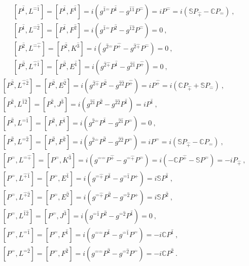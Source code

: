 \documentclass[12pt,a4paper]{report}
\begin{document}
\begin{align*}
    &\left[P^{\hat{1}},L^{\hat{-}\hat{1}}\right]=\left[P^{\hat{1}},F^\hat{1}\right]=i\left(g^{\hat{1}\hat{-}}P^{\hat{1}}-g^{\hat{1}\hat{1}}P^{\hat{-}}\right)=iP^{\hat{-}}=i\left(\mathbb{S}P_{\hat{+}}-\mathbb{C}P_{\hat{-}}\right)~,\\
    &\left[P^{\hat{1}},L^{\hat{-}\hat{2}}\right]=\left[P^{\hat{1}},F^\hat{2}\right]=i\left(g^{\hat{1}\hat{-}}P^{\hat{2}}-g^{\hat{1}\hat{2}}P^{\hat{-}}\right)=0~,\\
    &\left[P^{\hat{2}},L^{\hat{-}\hat{+}}\right]=\left[P^{\hat{2}},K^\hat{3}\right]=i\left(g^{\hat{2}\hat{-}}P^{\hat{+}}-g^{\hat{2}\hat{+}}P^{\hat{-}}\right)=0~,\\
    &\left[P^{\hat{2}},L^{\hat{+}\hat{1}}\right]=\left[P^{\hat{2}},E^\hat{1}\right]=i\left(g^{\hat{2}\hat{+}}P^{\hat{1}}-g^{\hat{2}\hat{1}}P^{\hat{+}}\right)=0~,
    \end{align*}
    \begin{align*}
    &\left[P^{\hat{2}},L^{\hat{+}\hat{2}}\right]=\left[P^{\hat{2}},E^\hat{2}\right]=i\left(g^{\hat{2}\hat{+}}P^{\hat{2}}-g^{\hat{2}\hat{2}}P^{\hat{+}}\right)=iP^{\hat{+}}=i\left(\mathbb{C}P_{\hat{+}}+\mathbb{S}P_{\hat{-}}\right)~,\\
    &\left[P^{\hat{2}},L^{\hat{1}\hat{2}}\right]=\left[P^{\hat{2}},J^\hat{3}\right]=i\left(g^{\hat{2}\hat{1}}P^{\hat{2}}-g^{\hat{2}\hat{2}}P^{\hat{1}}\right)=iP^{\hat{1}}~,\\
    &\left[P^{\hat{2}},L^{\hat{-}\hat{1}}\right]=\left[P^{\hat{2}},F^\hat{1}\right]=i\left(g^{\hat{2}\hat{-}}P^{\hat{1}}-g^{\hat{2}\hat{1}}P^{\hat{-}}\right)=0~,\\
    &\left[P^{\hat{2}},L^{\hat{-}\hat{2}}\right]=\left[P^{\hat{2}},F^\hat{2}\right]=i\left(g^{\hat{2}\hat{-}}P^{\hat{2}}-g^{\hat{2}\hat{2}}P^{\hat{-}}\right)=iP^{\hat{-}}=i\left(\mathbb{S}P_{\hat{+}}-\mathbb{C}P_{\hat{-}}\right)~,\\
    &\left[P^{\hat{-}},L^{\hat{-}\hat{+}}\right]=\left[P^{\hat{-}},K^{\hat{3}}\right]=i\left(g^{\hat{-}\hat{-}}P^{\hat{+}}-g^{\hat{-}\hat{+}}P^{\hat{-}}\right)=i\left(-\mathbb{C}P^{\hat{+}}-\mathbb{S}P^{\hat{-}}\right)=-iP_{\hat{+}}~,\\
    &\left[P^{\hat{-}},L^{\hat{+}\hat{1}}\right]=\left[P^{\hat{-}},E^\hat{1}\right]=i\left(g^{\hat{-}\hat{+}}P^{\hat{1}}-g^{\hat{-}\hat{1}}P^{\hat{+}}\right)=i\mathbb{S}P^{\hat{1}}~,\\
    &\left[P^{\hat{-}},L^{\hat{+}\hat{2}}\right]=\left[P^{\hat{-}},E^\hat{2}\right]=i\left(g^{\hat{-}\hat{+}}P^{\hat{2}}-g^{\hat{-}\hat{2}}P^{\hat{+}}\right)=i\mathbb{S}P^{\hat{2}}~,\\
    &\left[P^{\hat{-}},L^{\hat{1}\hat{2}}\right]=\left[P^{\hat{-}},J^\hat{3}\right]=i\left(g^{\hat{-}\hat{1}}P^{\hat{2}}-g^{\hat{-}\hat{2}}P^{\hat{1}}\right)=0~,\\
    &\left[P^{\hat{-}},L^{\hat{-}\hat{1}}\right]=\left[P^{\hat{-}},F^\hat{1}\right]=i\left(g^{\hat{-}\hat{-}}P^{\hat{1}}-g^{\hat{-}\hat{1}}P^{\hat{-}}\right)=-i\mathbb{C}P^{\hat{1}}~,\\
    &\left[P^{\hat{-}},L^{\hat{-}\hat{2}}\right]=\left[P^{\hat{-}},F^\hat{2}\right]=i\left(g^{\hat{-}\hat{-}}P^{\hat{2}}-g^{\hat{-}\hat{2}}P^{\hat{-}}\right)=-i\mathbb{C}P^{\hat{2}}~.
\end{align*}\\
\end{document}
